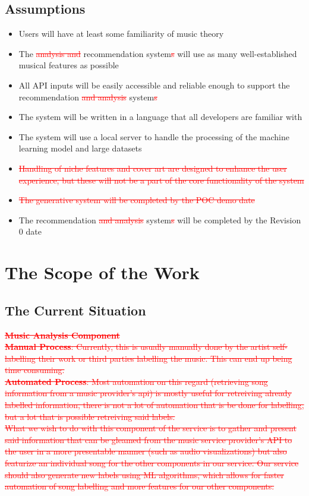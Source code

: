 \documentclass[12pt]{article}
\begin{document}
\subsection{Assumptions}
\begin{itemize}
  \item Users will have at least some familiarity of music theory
  \item The \textcolor{red}{\sout{analysis and}} recommendation system\textcolor{red}{\sout{s}} will use as many well-established musical 
  features as possible
  \item All API inputs will be easily accessible and reliable enough to support the
  recommendation \textcolor{red}{\sout{ and analysis}} system\textcolor{red}{\sout{s}}
  \item The system will be written in a language that all developers are familiar with
  \item The system will use a local server to handle the processing of
  the machine learning model and large datasets
  \item \textcolor{red}{\sout{Handling of niche features and cover art are designed to enhance the user experience, but 
  these will not be a part of the core functionality of the system}}
  \item \textcolor{red}{\sout{The generative system will be completed by the POC demo date}}
  \item The recommendation \textcolor{red}{\sout{and analysis}} system\textcolor{red}{\sout{s}} will be completed by the Revision 0 date
\end{itemize}

\section{The Scope of the Work}
\subsection{The Current Situation}
\textcolor{red}{\sout{\textbf{Music Analysis Component}}}
\\\textcolor{red}{\sout{\textbf{Manual Process}: Currently, this is usually manually done by the artist self-labelling their work
or third parties labelling the music. This can end up being time consuming. }}
\\\textcolor{red}{\sout{\textbf{Automated Process}: Most automation on this regard (retrieving song information from a music 
provider's api) is mostly useful for retreiving already labelled information, there is not a lot of automation 
that is be done for labelling, but a lot that is possible retreiving said labels. }}
\\\textcolor{red}{\sout{What we wish to do with this component of the service is to gather and present said information that can be
gleamed from the music service provider's API to the user in a more presentable manner (such as audio visualizations)
  but also featurize an individual song for the other components in our service. Our service should also generate new
  labels using ML algorithms, which allows for faster automation of song labelling and more features for our other 
  components. }}
\end{document}
